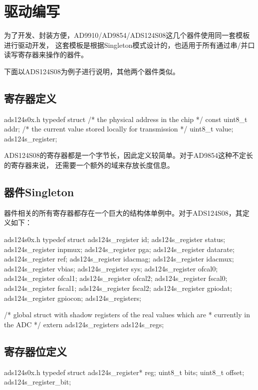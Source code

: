 \section{驱动编写}
为了开发、封装方便，AD9910/AD9854/ADS124S08这几个器件使用同一套模板进行驱动开发，
这套模板是根据Singleton模式设计的，也适用于所有通过串/并口读写寄存器来操作的器件。

下面以ADS124S08为例子进行说明，其他两个器件类似。

\subsection{寄存器定义}
\begin{cbox}{ads124s0x.h}
typedef struct
{
  /* the physical address in the chip */
  const uint8_t addr;
  /* the current value stored locally for transmission */
  uint8_t value;
} ads124s_register;
\end{cbox}

ADS124S08的寄存器都是一个字节长，因此定义较简单。对于AD9854这种不定长的寄存器来说，
还需要一个额外的域来存放长度信息。

\subsection{器件Singleton}
器件相关的所有寄存器都存在一个巨大的结构体单例中。对于ADS124S08，其定义如下：
\begin{cbox}{ads124s0x.h}
typedef struct
{
  ads124s_register id;
  ads124s_register status;
  ads124s_register inpmux;
  ads124s_register pga;
  ads124s_register datarate;
  ads124s_register ref;
  ads124s_register idacmag;
  ads124s_register idacmux;
  ads124s_register vbias;
  ads124s_register sys;
  ads124s_register ofcal0;
  ads124s_register ofcal1;
  ads124s_register ofcal2;
  ads124s_register fscal0;
  ads124s_register fscal1;
  ads124s_register fscal2;
  ads124s_register gpiodat;
  ads124s_register gpiocon;
} ads124s_registers;

/* global struct with shadow registers of the real values which are
 * currently in the ADC */
extern ads124s_registers ads124s_regs;
\end{cbox}

\subsection{寄存器位定义}
\begin{cbox}{ads124s0x.h}
typedef struct
{
  ads124s_register* reg;
  uint8_t bits;
  uint8_t offset;
} ads124s_register_bit;
\end{cbox}

